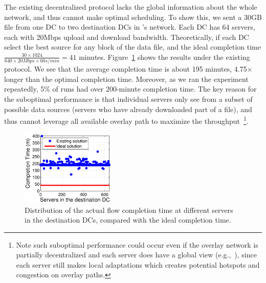The existing decentralized protocol lacks the global information
about the whole network, and thus cannot make optimal scheduling.
To show this, we sent a 30GB file from one DC to two destination 
DCs in \company's network. 
Each DC has 64 servers, each with 20Mbps upload and download 
bandwidth.
Theoretically, if each DC select
the best source for any block of the data file, and the ideal
completion time
$\frac{30\times 1024}{640\times 20Mbps \times 60s/min} = 41$
minutes.
Figure~\ref{fig:motivation} shows the results under the existing
protocol. We see that the average completion time is about
195 minutes, 4.75$\times$ longer than the optimal completion time.
Moreover, as we ran the experiment repeatedly,
5\% of runs had over 200-minute completion time. 
The key reason for the suboptimal performance is that 
individual servers only see from a subset of possible data sources 
(servers who have already downloaded part of a file), 
and thus cannot leverage all available overlay path to 
maximize the throughput~\footnote{Note such suboptimal performance 
could occur even if the overlay 
network is partially decentralized and each server does have a 
global view (e.g.,~\cite{VdnAtSigcomm13}), 
since each server still makes local adaptations which creates potential
hotspots and congestion on overlay paths.}. 


\begin{figure}[t]
  \centering
  \includegraphics[width=45mm]{images/SEvsIdeal.eps}
  \caption{Distribution of the actual flow completion time at different servers in the destination DCs,
compared with the ideal completion time. }
  \label{fig:motivation}
\vspace{-0.4cm}
\end{figure}

